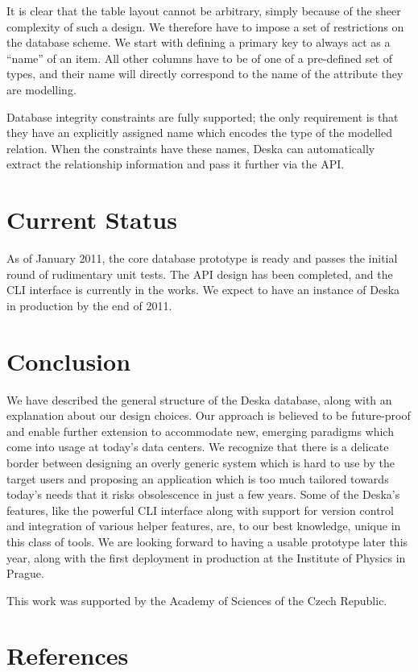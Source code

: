 \documentclass[a4paper]{jpconf}
\begin{document}
It is clear that the table layout cannot be arbitrary, simply because of the sheer complexity of such a design.  We therefore have to
impose a set of restrictions on the database scheme.  We start with defining a primary key to always act as a ``name'' of an item.  All
other columns have to be of one of a pre-defined set of types, and their name will directly correspond to the name of the attribute
they are modelling.

Database integrity constraints are fully supported; the only requirement is that they have an explicitly assigned name which encodes
the type of the modelled relation.  When the constraints have these names, Deska can automatically extract the relationship information
and pass it further via the API.

\section{Current Status}

As of January 2011, the core database prototype is ready and passes the initial round of rudimentary unit tests.  The API design has
been completed, and the CLI interface is currently in the works. We expect to have an instance of Deska in production by the end of
2011.

\section{Conclusion}

We have described the general structure of the Deska database, along with an explanation about our design choices.  Our approach is
believed to be future-proof and enable further extension to accommodate new, emerging paradigms which come into usage at today's data
centers.  We recognize that there is a delicate border between designing an overly generic system which is hard to use by the target
users and proposing an application which is too much tailored towards today's needs that it risks obsolescence in just a few years.
Some of the Deska's features, like the powerful CLI interface along with support for version control and integration of various helper
features, are, to our best knowledge, unique in this class of tools.  We are looking forward to having a usable prototype later this
year, along with the first deployment in production at the Institute of Physics in Prague.

\ack
This work was supported by the Academy of Sciences of the Czech Republic.

\section*{References}


\end{document}
